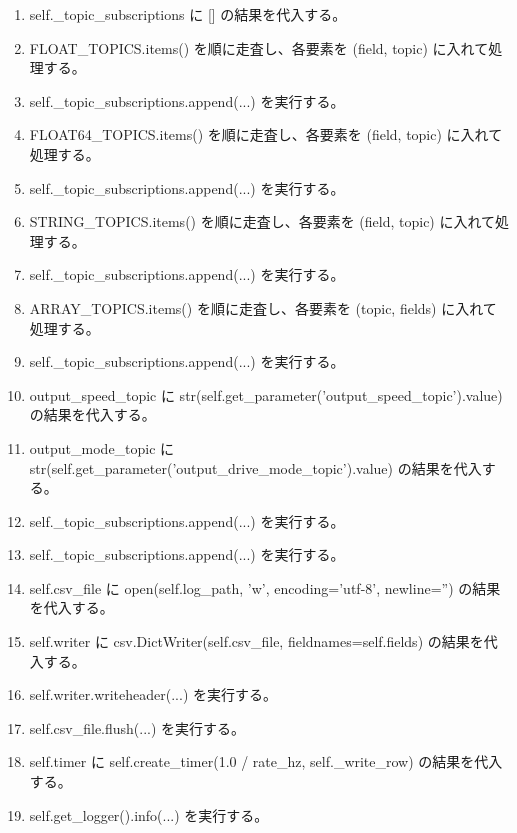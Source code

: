 \documentclass[a4paper,11pt]{article}
\begin{document}
\begin{enumerate}[leftmargin=1.8em]
\item self.\_topic\_subscriptions に [] の結果を代入する。
\item FLOAT\_TOPICS.items() を順に走査し、各要素を (field, topic) に入れて処理する。
\item   self.\_topic\_subscriptions.append(...) を実行する。
\item FLOAT64\_TOPICS.items() を順に走査し、各要素を (field, topic) に入れて処理する。
\item   self.\_topic\_subscriptions.append(...) を実行する。
\item STRING\_TOPICS.items() を順に走査し、各要素を (field, topic) に入れて処理する。
\item   self.\_topic\_subscriptions.append(...) を実行する。
\item ARRAY\_TOPICS.items() を順に走査し、各要素を (topic, fields) に入れて処理する。
\item   self.\_topic\_subscriptions.append(...) を実行する。
\item output\_speed\_topic に str(self.get\_parameter('output\_speed\_topic').value) の結果を代入する。
\item output\_mode\_topic に str(self.get\_parameter('output\_drive\_mode\_topic').value) の結果を代入する。
\item self.\_topic\_subscriptions.append(...) を実行する。
\item self.\_topic\_subscriptions.append(...) を実行する。
\item self.csv\_file に open(self.log\_path, 'w', encoding='utf-8', newline='') の結果を代入する。
\item self.writer に csv.DictWriter(self.csv\_file, fieldnames=self.fields) の結果を代入する。
\item self.writer.writeheader(...) を実行する。
\item self.csv\_file.flush(...) を実行する。
\item self.timer に self.create\_timer(1.0 / rate\_hz, self.\_write\_row) の結果を代入する。
\item self.get\_logger().info(...) を実行する。
            \end{enumerate}
\end{document}
